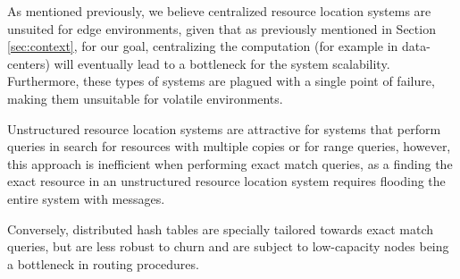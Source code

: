 As mentioned previously, we believe centralized resource location systems are unsuited for edge environments, given that as previously mentioned in Section \ref{sec:context}, for our goal, centralizing the computation (for example in data-centers) will eventually lead to a bottleneck for the system scalability. Furthermore, these types of systems are plagued with a single point of failure, making them unsuitable for volatile environments.

Unstructured resource location systems are attractive for systems that perform queries in search for resources with multiple copies or for range queries, however, this approach is inefficient when performing exact match queries, as a finding the exact resource in an unstructured resource location system requires flooding the entire system with messages.

Conversely, distributed hash tables are specially tailored towards exact match queries, but are less robust to churn and are subject to low-capacity nodes being a bottleneck in routing procedures. 










